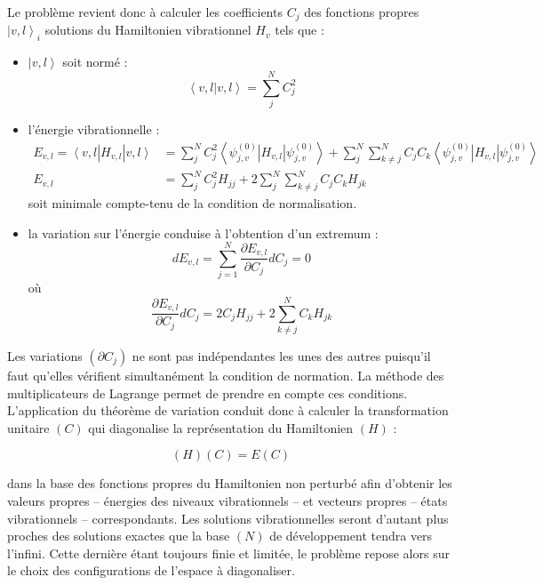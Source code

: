 Le problème revient donc à calculer les coefficients $C_j$ des fonctions propres $\left|v,l\right\rangle_i$ solutions du Hamiltonien vibrationnel $H_v$ tels que :

\begin{itemize}
	\item $\left|v,l\right\rangle$ soit normé : 
\begin{equation}
	\left\langle v,l\right|\left. v ,l\right\rangle = \sum^N_j C^2_j
\end{equation}
  \item l'énergie vibrationnelle : 
\begin{align}
	E_{v,l} = \left\langle v,l\right. \left|H_{v,l}\right|\left. v,l\right\rangle &= \sum^N_j C^2_j \left\langle \psi^{(0)}_{j,v}\right. \left|H_{v,l}\right|\left. \psi^{(0)}_{j,v}\right\rangle + \sum^N_j \sum^N_{k\neq j}C_jC_k \left\langle \psi^{(0)}_{j,v}\right. \left|H_{v,l}\right|\left. \psi^{(0)}_{j,v}\right\rangle \\
	E_{v,l} &= \sum^N_j C^2_j H_{jj} + 2 \sum^N_j \sum^N_{k\neq j} C_jC_k H_{jk}
\end{align}
\noindent soit minimale compte-tenu de la condition de normalisation.
   \item la variation sur l'énergie conduise à l'obtention d'un extremum : 
\begin{equation}
dE_{v,l} = \sum^N_{j=1} \frac{\partial E_{v,l}}{\partial C_j}dC_j = 0 	
\end{equation}
\noindent où
\begin{equation}
\frac{\partial E_{v,l}}{\partial C_j}dC_j = 2C_jH_{jj} + 2\sum^N_{k\neq j} C_kH_{jk}
\end{equation}
\end{itemize}


Les variations $(\partial C_j)$ ne sont pas indépendantes les unes des autres puisqu'il faut qu'elles vérifient simultanément la condition de normation. La méthode des multiplicateurs de Lagrange permet de prendre en compte ces conditions. L'application du théorème de variation conduit donc à calculer la transformation unitaire $(C)$ qui diagonalise la représentation du Hamiltonien $(H)$ :

\begin{equation}
	(H)(C) = E (C)
\end{equation}

\noindent dans la base des fonctions propres du Hamiltonien non perturbé afin d'obtenir les valeurs propres -- énergies des niveaux vibrationnels -- et vecteurs propres -- états vibrationnels -- correspondants. Les solutions vibrationnelles seront d'autant plus proches des solutions exactes que la base $(N)$ de développement tendra vers l'infini. Cette dernière étant toujours finie et limitée, le problème repose alors sur le choix des configurations de l'espace à diagonaliser.


